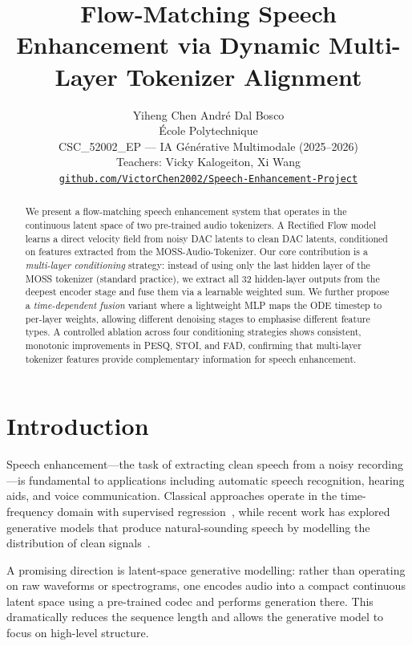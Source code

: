 \documentclass[10pt,twocolumn,letterpaper]{article}
\title{Flow-Matching Speech Enhancement via Dynamic Multi-Layer Tokenizer Alignment}
\author{
  Yiheng Chen \quad Andr\'{e} Dal Bosco\\
  \'{E}cole Polytechnique\\
  CSC\_52002\_EP --- IA G\'{e}n\'{e}rative Multimodale (2025--2026)\\
  Teachers: Vicky Kalogeiton, Xi Wang\\
  {\tt\small \href{https://github.com/VictorChen2002/Speech-Enhancement-Project}{github.com/VictorChen2002/Speech-Enhancement-Project}}
}
\begin{document}
\maketitle

\begin{abstract}
We present a flow-matching speech enhancement system that operates in the continuous latent space of two pre-trained audio tokenizers.
A Rectified Flow model learns a direct velocity field from noisy DAC latents to clean DAC latents, conditioned on features extracted from the MOSS-Audio-Tokenizer.
Our core contribution is a \emph{multi-layer conditioning} strategy: instead of using only the last hidden layer of the MOSS tokenizer (standard practice), we extract all 32 hidden-layer outputs from the deepest encoder stage and fuse them via a learnable weighted sum.
We further propose a \emph{time-dependent fusion} variant where a lightweight MLP maps the ODE timestep to per-layer weights, allowing different denoising stages to emphasise different feature types.
A controlled ablation across four conditioning strategies shows consistent, monotonic improvements in PESQ, STOI, and FAD, confirming that multi-layer tokenizer features provide complementary information for speech enhancement.
\end{abstract}

\section{Introduction}
\label{sec:intro}

Speech enhancement---the task of extracting clean speech from a noisy recording---is fundamental to applications including automatic speech recognition, hearing aids, and voice communication.
Classical approaches operate in the time-frequency domain with supervised regression~\cite{lu2013speech}, while recent work has explored generative models that produce natural-sounding speech by modelling the distribution of clean signals~\cite{richter2023speech}.

A promising direction is latent-space generative modelling: rather than operating on raw waveforms or spectrograms, one encodes audio into a compact continuous latent space using a pre-trained codec and performs generation there.
This dramatically reduces the sequence length and allows the generative model to focus on high-level structure.
\end{document}
